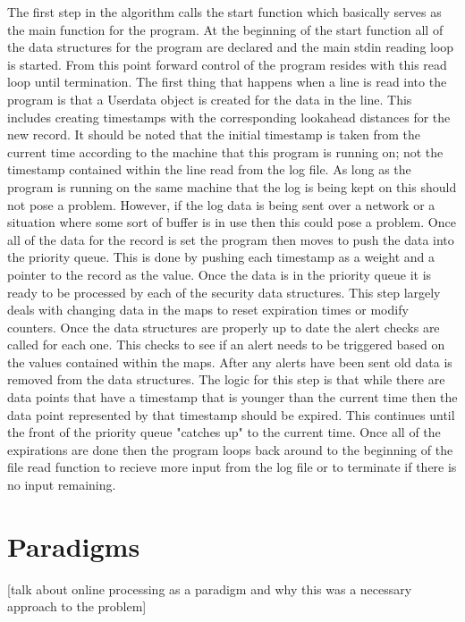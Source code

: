 \documentclass[12pt]{report}
\begin{document}
	\noindent
	The first step in the algorithm calls the start function which basically serves as the
	main function for the program. At the beginning of the start function all of the data structures
	for the program are declared and the main stdin reading loop is started. From this point 
	forward control of the program resides with this read loop until termination. The first thing
	that happens when a line is read into the program is that a Userdata object is created for the
	data in the line. This includes creating timestamps with the corresponding lookahead distances
	for the new record. It should be noted that the initial timestamp is taken from the current time
	according to the machine that this program is running on; not the timestamp contained within the
	line read from the log file. As long as the program is running on the same machine that the log
	is being kept on this should not pose a problem. However, if the log data is being sent over
	a network or a situation where some sort of buffer is in use then this could pose a problem.
	Once all of the data for the record is set the program then moves to push the data into the 
	priority queue. This is done by pushing each timestamp as a weight and a pointer to the record
	as the value. Once the data is in the priority queue it is ready to be processed by each of 
	the security data structures. This step largely deals with changing data in the maps to reset 
	expiration times or modify counters. Once the data structures are properly up to date the alert
	checks are called for each one. This checks to see if an alert needs to be triggered based on 
	the values contained within the maps. After any alerts have been sent old data is removed from
	the data structures. The logic for this step is that while there are data points that have a 
	timestamp that is younger than the current time then the data point represented by that 
	timestamp should be expired. This continues until the front of the priority queue "catches up"
	to the current time. Once all of the expirations are done then the program loops back around
	to the beginning of the file read function to recieve more input from the log file or to 
	terminate if there is no input remaining.

\section*{Paradigms}
	[talk about online processing as a paradigm
	and why this was a necessary approach to the 
	problem]
\end{document}
